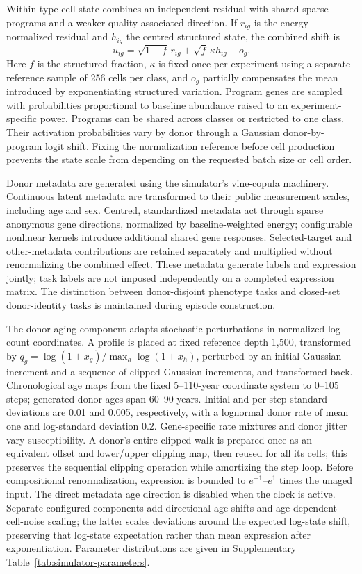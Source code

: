 Within-type cell state combines an independent residual with shared sparse programs and a weaker quality-associated direction. If $r_{ig}$ is the energy-normalized residual and $h_{ig}$ the centred structured state, the combined shift is
\begin{equation}
 u_{ig}=\sqrt{1-f}\,r_{ig}+\sqrt f\,\kappa h_{ig}-o_g.
 \label{eq:simulator-state}
\end{equation}
Here $f$ is the structured fraction, $\kappa$ is fixed once per experiment using a separate reference sample of 256 cells per class, and $o_g$ partially compensates the mean introduced by exponentiating structured variation. Program genes are sampled with probabilities proportional to baseline abundance raised to an experiment-specific power. Programs can be shared across classes or restricted to one class. Their activation probabilities vary by donor through a Gaussian donor-by-program logit shift. Fixing the normalization reference before cell production prevents the state scale from depending on the requested batch size or cell order.

Donor metadata are generated using the simulator's vine-copula machinery. Continuous latent metadata are transformed to their public measurement scales, including age and sex. Centred, standardized metadata act through sparse anonymous gene directions, normalized by baseline-weighted energy; configurable nonlinear kernels introduce additional shared gene responses. Selected-target and other-metadata contributions are retained separately and multiplied without renormalizing the combined effect. These metadata generate labels and expression jointly; task labels are not imposed independently on a completed expression matrix. The distinction between donor-disjoint phenotype tasks and closed-set donor-identity tasks is maintained during episode construction.

The donor aging component adapts stochastic perturbations in normalized log-count coordinates\cite{meyer2024stochasticaging}. A profile is placed at fixed reference depth 1,500, transformed by $q_g=\log(1+x_g)/\max_h\log(1+x_h)$, perturbed by an initial Gaussian increment and a sequence of clipped Gaussian increments, and transformed back. Chronological age maps from the fixed 5--110-year coordinate system to 0--105 steps; generated donor ages span 60--90 years. Initial and per-step standard deviations are 0.01 and 0.005, respectively, with a lognormal donor rate of mean one and log-standard deviation 0.2. Gene-specific rate mixtures and donor jitter vary susceptibility. A donor's entire clipped walk is prepared once as an equivalent offset and lower/upper clipping map, then reused for all its cells; this preserves the sequential clipping operation while amortizing the step loop. Before compositional renormalization, expression is bounded to $e^{-1}$--$e^1$ times the unaged input. The direct metadata age direction is disabled when the clock is active. Separate configured components add directional age shifts and age-dependent cell-noise scaling; the latter scales deviations around the expected log-state shift, preserving that log-state expectation rather than mean expression after exponentiation. Parameter distributions are given in Supplementary Table~\ref{tab:simulator-parameters}.

